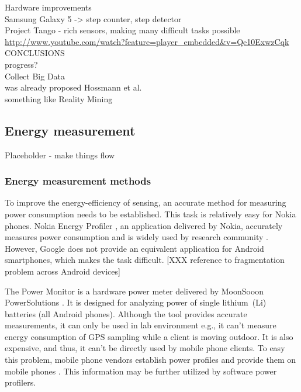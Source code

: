 Hardware improvements\\
	Samsung Galaxy 5 -> step counter, step detector\\
	Project Tango - rich sensors, making many difficult tasks possible\cite{google:tango}\\
		\url{http://www.youtube.com/watch?feature=player_embedded&v=Qe10ExwzCqk}
CONCLUSIONS\\
	progress?\\
	Collect Big Data\\
		was already proposed Hossmann et al.\cite{hossmann:bigdatasets}\\
		something like Reality Mining \cite{eagle:realitymining}\\
		
\subsection{Energy measurement}
Placeholder - make things flow\\
\subsubsection{Energy measurement methods}
\hspace{10pt} To improve the energy-efficiency of sensing, an accurate method for measuring power consumption needs to be established. This task is relatively easy for Nokia phones. Nokia Energy Profiler \cite{nokia:profiler}, an application delivered by Nokia,  accurately measures power consumption and is widely used by research community \cite{kjaergaard:entracked} \cite{lu:jigsaw} \cite{li:status}. However, Google does not provide an equivalent application for Android smartphones, which makes the task difficult. [XXX reference to fragmentation problem across Android devices]

The Power Monitor is a hardware power meter delivered by MoonSooon PowerSolutions \cite{monsoon:powermonitor}.  It is designed for analyzing power of single lithium\ (Li) batteries (all Android phones). Although the tool provides accurate measurements, it can only be used in lab environment e.g., it can't measure energy consumption of GPS sampling while a client is moving outdoor. It is also expensive, and thus, it can't be directly used by mobile phone clients. To easy this problem, mobile phone vendors establish power profiles and provide them on mobile phones \cite{android:powerprofiles}. This information may be further utilized by software power profilers.

